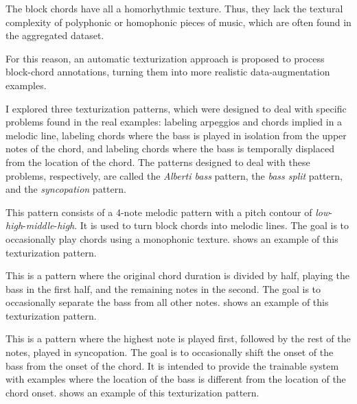 
The block chords have all a homorhythmic texture. Thus, they
lack the textural complexity of polyphonic or homophonic
pieces of music, which are often found in the aggregated
dataset.

For this reason, an automatic texturization approach is
proposed to process block-chord annotations, turning them
into more realistic data-augmentation examples.

I explored three texturization patterns, which were designed
to deal with specific problems found in the real examples:
labeling arpeggios and chords implied in a melodic line,
labeling chords where the bass is played in isolation from
the upper notes of the chord, and labeling chords where the
bass is temporally displaced from the location of the chord.
The patterns designed to deal with these problems,
respectively, are called the \emph{Alberti bass} pattern,
the \emph{bass split} pattern, and the \emph{syncopation}
pattern.


This pattern consists of a 4-note melodic pattern with a
pitch contour of
\emph{low}-\emph{high}-\emph{middle}-\emph{high}. It is used
to turn block chords into melodic lines. The goal is to
occasionally play chords using a monophonic texture.
 shows an example of this
texturization pattern.



This is a pattern where the original chord duration is
divided by half, playing the bass in the first half, and the
remaining notes in the second. The goal is to occasionally
separate the bass from all other notes.
 shows an example of this
texturization pattern.



This is a pattern where the highest note is played first,
followed by the rest of the notes, played in syncopation.
The goal is to occasionally shift the onset of the bass from
the onset of the chord. It is intended to provide the
trainable system with examples where the location of the
bass is different from the location of the chord onset.
 shows an example of this
texturization pattern.

